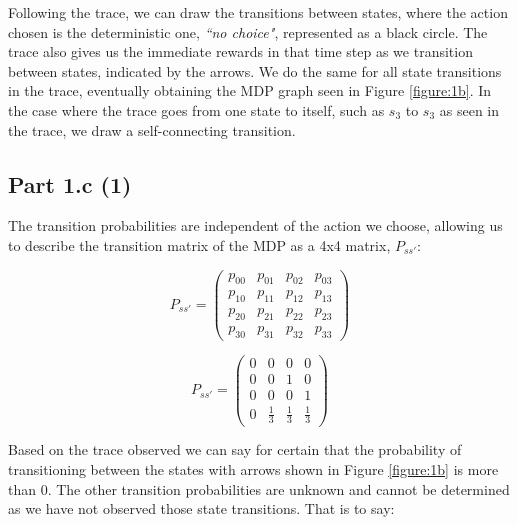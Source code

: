 \documentclass[12pt]{article}
\begin{document}
Following the trace, we can draw the transitions between states, where the action chosen is the deterministic one, \textit{``no choice"}, represented as a black circle. The trace also gives us the immediate rewards in that time step as we transition between states, indicated by the arrows. We do the same for all state transitions in the trace, eventually obtaining the MDP graph seen in Figure \ref{figure:1b}. In the case where the trace goes from one state to itself, such as \(s_3\) to \(s_3\) as seen in the trace, we draw a self-connecting transition.

\subsection*{Part 1.c (1)}
The transition probabilities are independent of the action we choose, allowing us to describe the transition matrix of the MDP as a 4x4 matrix, \(P_{ss'}\):\vspace{1em}

\begin{minipage}{.5\textwidth}
    \begin{equation}
    P_{ss'} = 
        \begin{pmatrix}
            p_{00} & p_{01} & p_{02} & p_{03}\\
            p_{10} & p_{11} & p_{12} & p_{13}\\
            p_{20} & p_{21} & p_{22} & p_{23}\\
            p_{30} & p_{31} & p_{32} & p_{33}
        \end{pmatrix}
    \end{equation}
\end{minipage}
\begin{minipage}{.5\textwidth}
    \begin{equation}
    P_{ss'} = 
        \begin{pmatrix}
            0 & 0 & 0 & 0\\
            0 & 0 & 1 & 0\\
            0 & 0 & 0 & 1\\
            0 & \frac{1}{3} & \frac{1}{3} & \frac{1}{3}
        \end{pmatrix}
    \end{equation}
\end{minipage}
\vspace{1em}

Based on the trace observed we can say for certain that the probability of transitioning between the states with arrows shown in Figure \ref{figure:1b} is more than 0. The other transition probabilities are unknown and cannot be determined as we have not observed those state transitions. That is to say:\vspace{1em}
\end{document}

